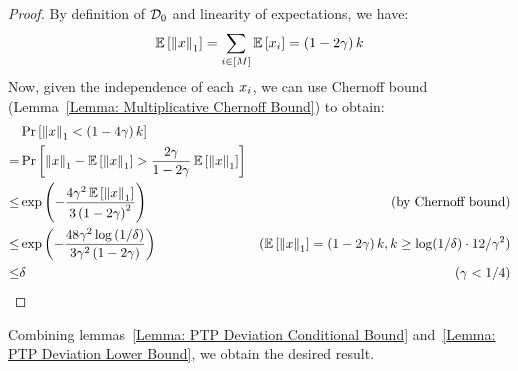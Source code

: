 \begin{proof}
    By definition of $\mathcal{D}_0$ and linearity of expectations, we have:
    \begin{align*}
        \operatorname*{\mathbb{E}}{\left[{\left\|{x}\right\|_1}\right]} = \sum_{i \in [M]} \operatorname*{\mathbb{E}}\left[{x_i}\right] = \left({1-2\gamma}\right)k
    \end{align*}
    Now, given the independence of each $x_i$, we can use Chernoff bound (Lemma~\ref{Lemma: Multiplicative Chernoff Bound}) to obtain:
    \begin{align*}
        & \Pr\left[{\left\|{x}\right\|_1 < \left({1-4\gamma}\right)k}\right] \\
        =&\Pr\left[{\left\|{x}\right\|_1 - \operatorname*{\mathbb{E}}{\left[{\left\|{x}\right\|_1}\right]} > \frac{2\gamma}{1-2\gamma}\operatorname*{\mathbb{E}}{\left[{\left\|{x}\right\|_1}\right]}}\right]\\
        \leq& \exp{\left({-\frac{4\gamma^2\operatorname*{\mathbb{E}}{\left[{\left\|{x}\right\|_1}\right]}}{3\left({1-2\gamma}\right)^2}}\right)}  & \text{(by Chernoff bound)}\\
        \leq& \exp{\left({-\frac{48\gamma^2\log\left({1/\delta}\right)}{3\gamma^2\left({1-2\gamma}\right)}}\right)} &(\operatorname*{\mathbb{E}}{\left[{\left\|{x}\right\|_1}\right]} = \left({1-2\gamma}\right)k, k \geq \log(1/\delta)\cdot12/\gamma^2)\\
        \leq& \delta &(\gamma < 1/4)
    \end{align*}
\end{proof}


Combining lemmas~\ref{Lemma: PTP Deviation Conditional Bound} and~\ref{Lemma: PTP Deviation Lower Bound}, we obtain the desired result.


